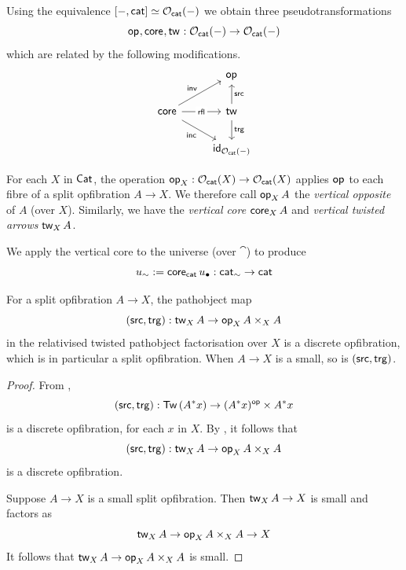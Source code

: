 \begin{definition}\label{def:relativised-constructions}
Using the equivalence $[-,\cat] \simeq \smlopfibcart(-)$
we obtain three pseudotransformations
\[{\vOp{}}, {\vCore{}}, {\vTw{}}
: \smlopfibcart(-) \to \smlopfibcart(-) \]
which are related by the following modifications.
\[
\begin{tikzcd}
  & {\vOp{}} \\
  {\vCore{}} & {\vTw{}} \\
  & {\id_{\smlopfibcart(-)}}
  \arrow["\inv", from=2-1, to=1-2]
  \arrow["\rfl"{description}, from=2-1, to=2-2]
  \arrow["\inc"', from=2-1, to=3-2]
  \arrow["\src"', from=2-2, to=1-2]
  \arrow["\trg", from=2-2, to=3-2]
\end{tikzcd}
\]
\end{definition}
For each $X$ in $\Cat$,
the operation $\vOp[X]{} : \smlopfibcart(X) \to \smlopfibcart(X)$
applies $\vOp{}$ to each fibre of a split opfibration $A \to X$.
We therefore call $\vOp[X]{A}$ the \emph{vertical opposite} of $A$ (over $X$).
Similarly, we have the \emph{vertical core} $\vCore[X]{A}$ and \emph{vertical twisted arrows} $\vTw[X]{A}$.
\begin{definition}
  We apply the vertical core to the universe (over $\cat$) to produce
  \[ \usim := \vCore[\cat]{\ulow} : \cat_\sim \to \cat \]
\end{definition}
 
\begin{proposition}\label{prop:local-src-trg-discrete-opfibration}
  For a split opfibration $A \to X$,
  the pathobject map
  \[(\src,\trg) : \vTw[X] A \to \vOp[X]{A} \times_X A\]
  in the relativised twisted pathobject factorisation over $X$
  is a discrete opfibration,
  which is in particular a split opfibration.  
  When $A \to X$ is a small, so is $(\src,\trg)$.
\end{proposition}
\begin{proof}
  From ,
  \[(\src, \trg) : \Tw{(A^* x)} \to (A^* x)^\op \times A^* x\]
  is a discrete opfibration, for each $x$ in $X$.
  By ,
  it follows that
  \[(\src,\trg) : \vTw[X] A \to \vOp[X]{A} \times_X A\]
  is a discrete opfibration.
  
  Suppose $A \to X$ is a small split opfibration.
  Then $\vTw[X] A \to X$ is small and
  factors as
  \[\vTw[X] A \to \vOp[X] A \times_X A \to X\]
  It follows that $\vTw[X] A \to \vOp[X] A \times_X A$ is small.
\end{proof}

